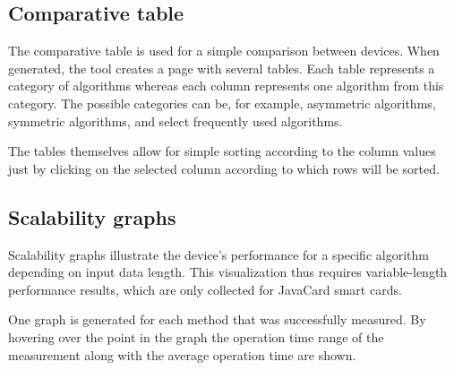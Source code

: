 
\subsection{Comparative table}
The comparative table is used for a simple comparison between devices. When generated, the tool creates a page with several tables. Each table represents a category of algorithms whereas each column represents one algorithm from this category. The possible categories can be, for example, asymmetric algorithms, symmetric algorithms, and select frequently used algorithms.

The tables themselves allow for simple sorting according to the column values just by clicking on the selected column according to which rows will be sorted.


\subsection{Scalability graphs}
Scalability graphs illustrate the device's performance for a specific algorithm depending on input data length. This visualization thus requires variable-length performance results, which are only collected for JavaCard smart cards.

One graph is generated for each method that was successfully measured. By hovering over the point in the graph the operation time range of the measurement along with the average operation time are shown.





